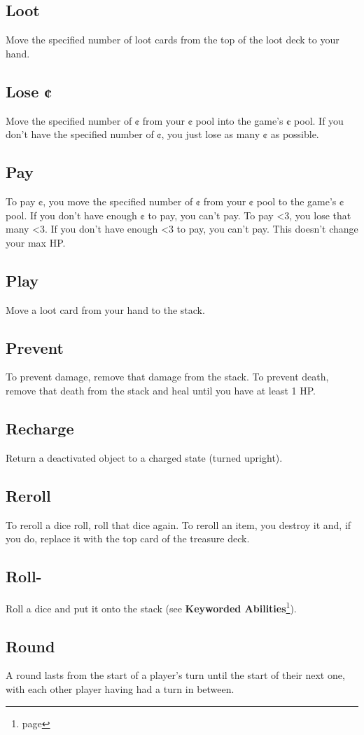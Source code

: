 \documentclass[a4paper, twoside]{report} %
\begin{document}
    \subsection*{Loot}
    Move the specified number of loot cards from the top of the loot deck to your hand.
    \subsection*{Lose ¢}
    Move the specified number of ¢ from your ¢ pool into the game’s ¢ pool. If you don’t have the specified number of ¢, you just lose as many ¢ as possible.
    \subsection*{Pay}
    To pay ¢, you move the specified number of ¢ from your ¢ pool to the game’s ¢ pool. If you don’t have enough ¢ to pay, you can’t pay. To pay <3, you lose that many <3. If you don’t have enough <3 to pay, you can’t pay. This doesn’t change your max HP.
    \subsection*{Play}
    Move a loot card from your hand to the stack.
    \subsection*{Prevent}
    To prevent damage, remove that damage from the stack. To prevent death, remove that death from the stack and heal until you have at least 1 HP.
    \subsection*{Recharge}
    Return a deactivated object to a charged state (turned upright).
    \subsection*{Reroll}
    To reroll a dice roll, roll that dice again. To reroll an item, you destroy it and, if you do, replace it with the top card of the treasure deck.
    \subsection*{Roll-}
    Roll a dice and put it onto the stack (see \textbf{Keyworded Abilities}\footnote{page \pageref{keyworded}}).
    \subsection*{Round}
    A round lasts from the start of a player’s turn until the start of their next one, with each other player having had a turn in between.
\end{document}
